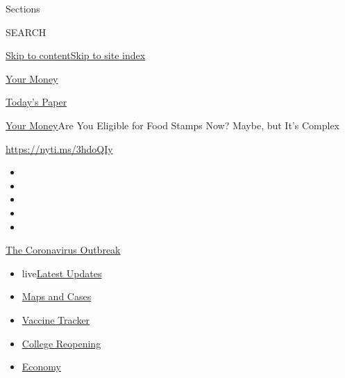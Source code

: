 Sections

SEARCH

\protect\hyperlink{site-content}{Skip to
content}\protect\hyperlink{site-index}{Skip to site index}

\href{https://www.nytimes3xbfgragh.onion/section/your-money}{Your Money}

\href{https://myaccount.nytimes3xbfgragh.onion/auth/login?response_type=cookie\&client_id=vi}{}

\href{https://www.nytimes3xbfgragh.onion/section/todayspaper}{Today's
Paper}

\href{/section/your-money}{Your Money}\textbar{}Are You Eligible for
Food Stamps Now? Maybe, but It's Complex

\href{https://nyti.ms/3hdoQIy}{https://nyti.ms/3hdoQIy}

\begin{itemize}
\item
\item
\item
\item
\item
\end{itemize}

\href{https://www.nytimes3xbfgragh.onion/news-event/coronavirus?action=click\&pgtype=Article\&state=default\&region=TOP_BANNER\&context=storylines_menu}{The
Coronavirus Outbreak}

\begin{itemize}
\tightlist
\item
  live\href{https://www.nytimes3xbfgragh.onion/2020/08/03/world/coronavirus-covid-19.html?action=click\&pgtype=Article\&state=default\&region=TOP_BANNER\&context=storylines_menu}{Latest
  Updates}
\item
  \href{https://www.nytimes3xbfgragh.onion/interactive/2020/us/coronavirus-us-cases.html?action=click\&pgtype=Article\&state=default\&region=TOP_BANNER\&context=storylines_menu}{Maps
  and Cases}
\item
  \href{https://www.nytimes3xbfgragh.onion/interactive/2020/science/coronavirus-vaccine-tracker.html?action=click\&pgtype=Article\&state=default\&region=TOP_BANNER\&context=storylines_menu}{Vaccine
  Tracker}
\item
  \href{https://www.nytimes3xbfgragh.onion/2020/08/02/us/covid-college-reopening.html?action=click\&pgtype=Article\&state=default\&region=TOP_BANNER\&context=storylines_menu}{College
  Reopening}
\item
  \href{https://www.nytimes3xbfgragh.onion/live/2020/08/03/business/stock-market-today-coronavirus?action=click\&pgtype=Article\&state=default\&region=TOP_BANNER\&context=storylines_menu}{Economy}
\end{itemize}

